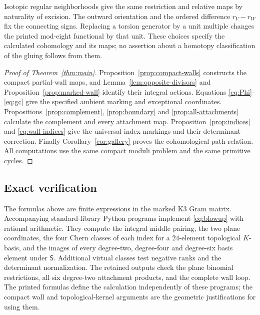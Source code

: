 Isotopic regular neighborhoods give the same restriction
and relative maps by naturality of excision. The outward
orientation and the ordered difference $r_V-r_W$ fix
the connecting signs. Replacing a torsion generator by
a unit multiple changes the printed mod-eight functional
by that unit. These choices specify the calculated
cohomology and its maps; no assertion about a homotopy
classification of the gluing follows from them.

\begin{proof}[Proof of Theorem~\ref{thm:main}]
Proposition~\ref{prop:compact-walls} constructs the
compact partial-wall maps, and
Lemma~\ref{lem:opposite-divisors} and
Proposition~\ref{prop:marked-wall} identify their
integral actions. Equations \eqref{eq:Phi}--\eqref{eq:gc}
give the specified ambient marking and exceptional
coordinates. Propositions~\ref{prop:complement},
\ref{prop:boundary} and \ref{prop:all-attachments}
calculate the complement and every attachment map.
Proposition~\ref{prop:indices} and
\eqref{eq:wall-indices} give the universal-index
markings and their determinant correction. Finally
Corollary~\ref{cor:gallery} proves the cohomological
path relation. All computations use the same compact
moduli problem and the same primitive cycles.
\end{proof}

\subsection{Exact verification}
The formulas above are finite expressions in the marked
K3 Gram matrix. Accompanying standard-library Python
programs implement \eqref{eq:blowup} with rational
arithmetic. They compute the integral middle pairing,
the two plane coordinates, the four Chern classes of
each index for a $24$-element topological $K$-basis, and
the images of every degree-two, degree-four and
degree-six basis element under $\mathsf S$. Additional virtual
classes test negative ranks and the determinant
normalization. The retained outputs check the plane
binomial restrictions, all six degree-two attachment
products, and the complete wall loop. The printed
formulas define the calculation independently of these
programs; the compact wall and topological-kernel
arguments are the geometric justifications for using
them.
